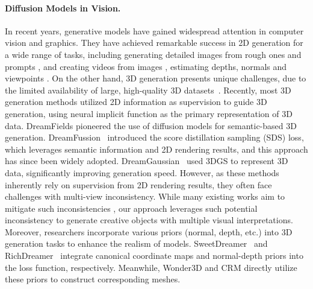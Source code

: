 \paragraph{Diffusion Models in Vision.} In recent years, generative models have gained widespread attention in computer vision and graphics. They have achieved remarkable success in 2D generation for a wide range of tasks, including generating detailed images from rough ones \cite{SUPIR,yang2023pasd,lin2024diffbir,wang2024exploiting} and prompts \cite{DALLE,LatentDiffusion,Photorealistic}, and creating videos from images \cite{sun2024dimensionx,yu2024viewcrafter}, estimating depths, normals \cite{depth_anything_v1, depth_anything_v2, ye2024stablenormal,he2024lotus} and viewpoints \cite{dust3r,pd}.
On the other hand, 3D generation presents unique challenges, due to the limited availability of large, high-quality 3D datasets~\cite{ABC,wu2023omniobject3d,objaverse,objaverseXL}. Recently, most 3D generation methods \cite{jain2021dreamfields,poole2022dreamfusion,wang2023prolificdreamer,lin2023magic3d,chen2023fantasia3d,MAkeit3D} utilized 2D information as supervision to guide 3D generation, using neural implicit function as the primary representation of 3D data. DreamFields \cite{jain2021dreamfields} pioneered the use of diffusion models for semantic-based 3D generation. DreamFussion~\cite{poole2022dreamfusion} introduced the score distillation sampling (SDS) loss, which leverages semantic information and 2D rendering results, and this approach has since been widely adopted. DreamGaussian~\cite{tang2023dreamgaussian} used 3DGS to represent 3D data, significantly improving generation speed. However, as these methods inherently rely on supervision from 2D rendering results, they often face challenges with multi-view inconsistency. While many existing works aim to mitigate such inconsistencies \cite{liu2023zero1to3,shi2023MVDream}, our approach leverages such potential inconsistency to generate creative objects with multiple visual interpretations. Moreover, researchers incorporate various priors (normal, depth, etc.) into 3D generation tasks to enhance the realism of models. SweetDreamer~\cite{sweetdreamer} and RichDreamer \cite{qiu2024richdreamer}~integrate canonical coordinate maps and normal-depth priors into the loss function, respectively. Meanwhile, Wonder3D \cite{long2023wonder3d} and CRM \cite{wang2024crm} directly utilize these priors to construct corresponding meshes. 
